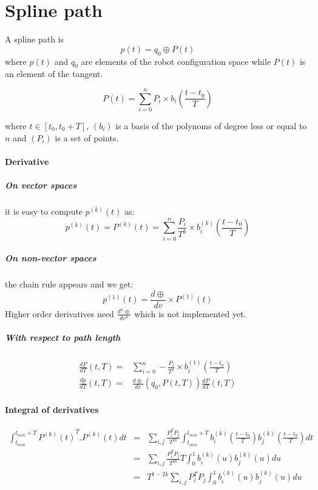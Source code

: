 \documentclass {article}
\begin{document}
\section{Spline path}

A spline path is
$$
p (t) = q_0 \oplus P(t)
$$
where $p(t)$ and $q_0$ are elements of the robot configuration space while
$P(t)$ is an element of the tangent.

$$
P (t) = \sum_{i=0}^n P_i \times b_i(\frac{t - t_0}{T})
$$

where $t \in \left[ t_0, t_0 + T \right]$, $(b_i)$ is a basis of the polynoms
of degree less or equal to $n$ and $(P_i)$ is a set of points.

\paragraph{Derivative}

\subparagraph{On vector spaces} it is easy to compute $p^{(k)}(t)$ as:
$$
p^{(k)} (t) = P^{(k)} (t) = \sum_{i=0}^n \frac{P_i}{T^k} \times b_i^{(k)}(\frac{t - t_0}{T})
$$

\subparagraph{On non-vector spaces} the chain rule appears and we get:
$$
p^{(1)} (t) = \frac{d\oplus}{dv} \times P^{(1)} (t)
$$
Higher order derivatives need $\frac{d^n\oplus}{dv^n}$ which is not implemented yet.

\subparagraph{With respect to path length}
\begin{eqnarray*}
\frac{dP}{dT} (t,T) =& \sum_{i=0}^n - \frac{P_i}{T^2} \times b_i^{(1)}(\frac{t - t_0}{T}) \\
\frac{dp}{dT} (t,T) =& \frac{d\oplus}{dv}(q_0, P(t,T)) \frac{dP}{dT} (t, T)
\end{eqnarray*}

\paragraph{Integral of derivatives}
\begin{eqnarray*}
\int_{t_{min}}^{t_{min} + T} {P^{(k)} (t)}^T . P^{(k)} (t) dt
&=& \sum_{i,j} \frac{P_i^T P_j}{T^{2k}} \int_{t_{min}}^{t_{min} + T} b_i^{(k)}(\frac{t - t_0}{T}) b_j^{(k)}(\frac{t - t_0}{T}) dt \\
&=& \sum_{i,j} \frac{P_i^T P_j}{T^{2k}} T \int_0^1 b_i^{(k)}(u) b_j^{(k)}(u) du \\
&=& T^{1-2k} \sum_{i,j} P_i^T P_j \int_0^1 b_i^{(k)}(u) b_j^{(k)}(u) du \\
\end{eqnarray*}
\end{document}
